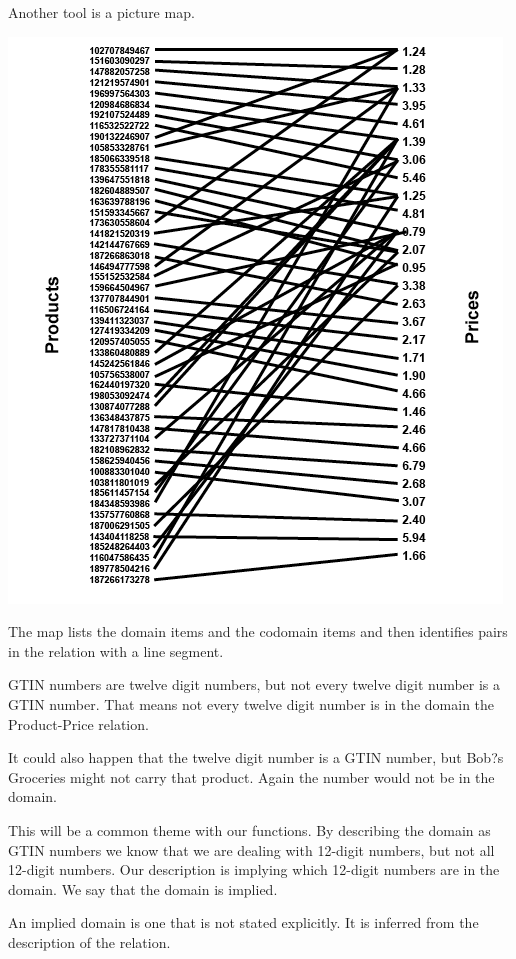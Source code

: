 \documentclass{ximera}
\begin{document}
Another tool is a picture map.
\begin{image}
\includegraphics{pics/Product_Price_Map.png}
\end{image}

The map lists the domain items and the codomain items and then identifies pairs in the relation with a line segment.



GTIN numbers are twelve digit numbers, but not every twelve digit number is a GTIN number. That means not every twelve digit number is in the domain the Product-Price relation.

It could also happen that the twelve digit number is a GTIN number, but Bob?s Groceries might not carry that product.  Again the number would not be in the domain.

This will be a common theme with our functions. By describing the domain as GTIN numbers we know that we are dealing with 12-digit numbers, but not all 12-digit numbers. Our description is implying which 12-digit numbers are in the domain.  We say that the domain is implied.

\begin{definition}
An implied domain is one that is not stated explicitly. It is inferred from the description of the relation.
\end{definition}
\end{document}
